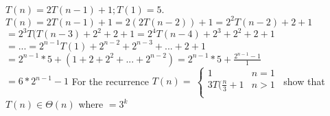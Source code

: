 \documentclass[12pt,largemargins]{homework}
\begin{document}
\question
$T ( n ) = 2 T ( n-1 ) + 1 ; T ( 1 ) = 5 .$\\
$T(n) = 2T(n-1)+1 =  2(2T(n-2))+1 = 2^2T(n-2)+2+1$\\
$=2^3T(T(n-3)+2^2+2+1 = 2^4T(n-4)+2^3+2^2+2+1$\\
$=...=2^{n-1}T(1)+2^{n-2}+2^{n-3}+...+2+1$\\
$=2^{n-1}*5+(1+2+2^2+...+2^{n-2})=2^{n-1}*5+\frac{2^{n-1}-1}{1}$\\
$=6*2^{n-1}-1$
\question
For the recurrence $T(n)=
\ \begin{cases} 
      1 & n =1\\
      3T(\frac{n}{3} +1 & n >1\\
   \end{cases}
\,$ show that $T(n) \in \Theta(n)$
where $=3^k$\\
\end{document}
